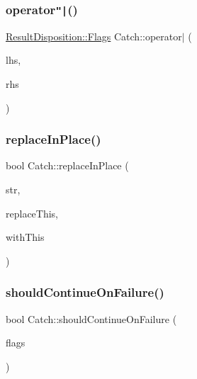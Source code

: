 \mbox{\label{namespaceCatch_ab32a083e442cc09f736327d2e2865999}} 
\subsubsection{\texorpdfstring{operator\texttt{"|}()}{operator|()}}
{\footnotesize\ttfamily \mbox{\hyperlink{structCatch_1_1ResultDisposition_a3396cad6e2259af326b3aae93e23e9d8}{Result\+Disposition\+::\+Flags}} Catch\+::operator$\vert$ (\begin{DoxyParamCaption}\item[{\mbox{\hyperlink{structCatch_1_1ResultDisposition_a3396cad6e2259af326b3aae93e23e9d8}{Result\+Disposition\+::\+Flags}}}]{lhs,  }\item[{\mbox{\hyperlink{structCatch_1_1ResultDisposition_a3396cad6e2259af326b3aae93e23e9d8}{Result\+Disposition\+::\+Flags}}}]{rhs }\end{DoxyParamCaption})}

\mbox{\label{namespaceCatch_afe4e6770da547e43e9e4eeaa05f946ea}} 
\subsubsection{\texorpdfstring{replace\+In\+Place()}{replaceInPlace()}}
{\footnotesize\ttfamily bool Catch\+::replace\+In\+Place (\begin{DoxyParamCaption}\item[{std\+::string \&}]{str,  }\item[{std\+::string const \&}]{replace\+This,  }\item[{std\+::string const \&}]{with\+This }\end{DoxyParamCaption})}

\mbox{\label{namespaceCatch_a7f7480b15d74965459c844f0d393ed87}} 
\subsubsection{\texorpdfstring{should\+Continue\+On\+Failure()}{shouldContinueOnFailure()}}
{\footnotesize\ttfamily bool Catch\+::should\+Continue\+On\+Failure (\begin{DoxyParamCaption}\item[{int}]{flags }\end{DoxyParamCaption})}

